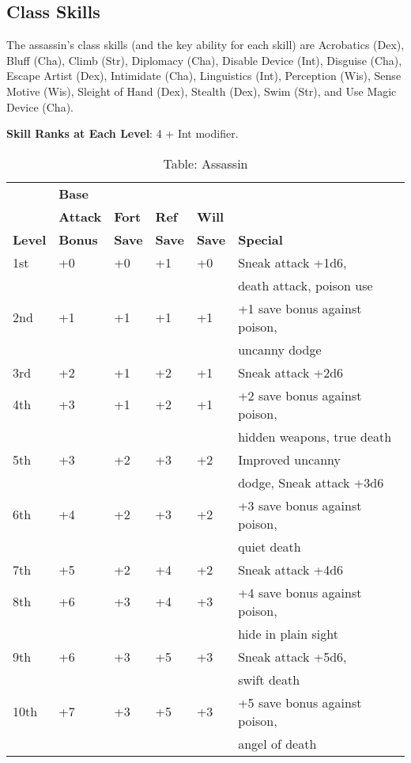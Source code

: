 \subsection{Class Skills}

				
The assassin's class skills (and the key ability for each skill) are Acrobatics (Dex), Bluff (Cha), Climb (Str), Diplomacy (Cha), Disable Device (Int), Disguise (Cha), Escape Artist (Dex), Intimidate (Cha), Linguistics (Int), Perception (Wis), Sense Motive (Wis), Sleight of Hand (Dex), Stealth (Dex), Swim (Str), and Use Magic Device (Cha). 
				
\textbf{ Skill Ranks at Each Level}: 4 + Int modifier.

\begin{table}[]
\sffamily
\setlength{\tabcolsep}{1pt}
\caption{Table: Assassin}
\begin{tabular}{llllll}
               & \textbf{Base}  \\
               & \textbf{Attack}& \textbf{Fort} & \textbf{Ref}  & \textbf{Will}\\
\textbf{Level} & \textbf{Bonus} & \textbf{Save} & \textbf{Save} & \textbf{Save} & \textbf{Special}\\
1st & +0 & +0 & +1 & +0 & Sneak attack +1d6, \\
    &    &    &    &    & death attack, poison use\\
2nd & +1 & +1 & +1 & +1 & +1 save bonus against poison, \\
    &    &    &    &    & uncanny dodge \\
3rd & +2 & +1 & +2 & +1 & Sneak attack +2d6\\
4th & +3 & +1 & +2 & +1 & +2 save bonus against poison,\\
    &    &    &    &    &  hidden weapons, true death \\
5th & +3 & +2 & +3 & +2 & Improved uncanny \\
    &    &    &    &    & dodge, Sneak attack +3d6\\
6th & +4 & +2 & +3 & +2 & +3 save bonus against poison, \\
    &    &    &    &    & quiet death\\
7th & +5 & +2 & +4 & +2 & Sneak attack +4d6\\
8th & +6 & +3 & +4 & +3 & +4 save bonus against poison,\\
    &    &    &    &    & hide in plain sight\\
9th & +6 & +3 & +5 & +3 & Sneak attack +5d6, \\
    &    &    &    &    & swift death\\
10th & +7 & +3 & +5 & +3 & +5 save bonus against poison,\\
    &    &     &    &    & angel of death\\
\end{tabular}
\end{table}

